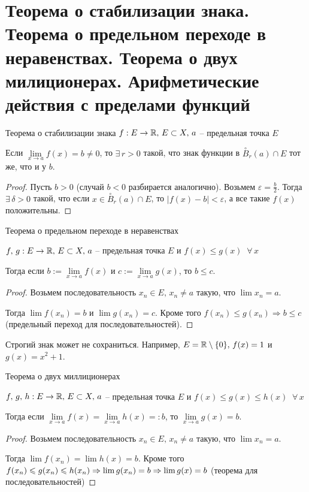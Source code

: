 \section{Теорема о стабилизации знака. Теорема о предельном переходе в неравенствах. Теорема о двух милиционерах. Арифметические действия с пределами функций}

\begin{theorem-non}
    Теорема о стабилизации знака
$f : E \to \mathbb{R}, \, E \subset X, \, a$ -- предельная точка $E$

Если $\lim\limits_{x \to a} f(x) = b \neq 0$, то $\exists \, r > 0$ такой, что знак функции в $\overset{\circ}{B}_r(a) \cap E$ тот же, что и у $b$.
\end{theorem-non}
\begin{proof}
    Пусть $b > 0$ (случай $b < 0$ разбирается аналогично). Возьмем $\varepsilon = \frac{b}{2}$. 
    Тогда $\exists \, \delta > 0$ такой, что если $x \in \overset{\circ}{B}_r(a) \cap E$, то $|f(x) - b| < \varepsilon$,
    а все такие $f(x)$ положительны.
\end{proof}

\begin{theorem-non}
    Теорема о предельном переходе в неравенствах

    $f, \, g : E \to \mathbb{R}, \, E \subset X, \, a$ -- предельная точка $E$ и $f(x) \leqslant g(x) \;\; \forall \, x$

    Тогда если $b := \lim\limits_{x \to a} f(x)$ и $c := \lim\limits_{x \to a} g(x)$, то $b \leqslant c$.
\end{theorem-non}
\begin{proof}
    Возьмем последовательность $x_n \in E, \, x_n \neq a$ такую, что $\lim x_n = a$. 

    Тогда $\lim f(x_n) = b$ и $\lim g(x_n) = c$. Кроме того $f(x_n) \leqslant g(x_n) \Rightarrow b \leqslant c$ (предельный переход для последовательностей).
\end{proof}
\begin{notice}
    Строгий знак может не сохраниться. Например, $E = \mathbb{R} \setminus \{0\}, \, f(x) = 1$ и $g(x) = x^2 + 1$.
\end{notice}

\begin{theorem-non}
    Теорема о двух миллиционерах

    $f, \, g, \, h : E \to \mathbb{R}, \, E \subset X, \, a$ -- предельная точка $E$ и $f(x) \leqslant g(x) \leqslant h(x) \;\; \forall \, x$

    Тогда если $\lim\limits_{x \to a} f(x) = \lim\limits_{x \to a} h(x) =: b$, то $\lim\limits_{x \to a} g(x) = b$.
\end{theorem-non}
\begin{proof}
    Возьмем последовательность $x_n \in E, \, x_n \neq a$ такую, что $\lim x_n = a$. 

    Тогда $\lim f(x_n) = \lim h(x) = b$. Кроме того $f(x_n) \leqslant g(x_n) \leqslant h(x_n) \Rightarrow \lim g(x_n) = b \\ \Rightarrow \lim g(x) = b$
    (теорема для последовательностей)
\end{proof}

